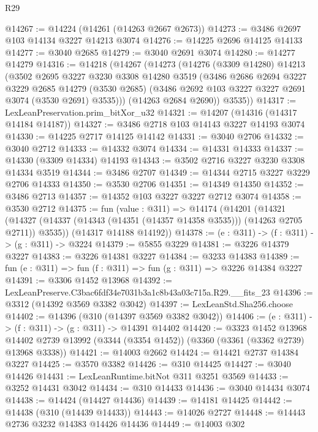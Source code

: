 \begin{lexlean}{R29}
\begin{coremodule}
@14267 := @14224 (@14261 (@14263 @2667 @2673))
@14273 := @3486 @2697 @103 @14134 @3227 @14213 @3074
@14276 := @14225 @2696 @14125 @14133
@14277 := @3040 @2685
@14279 := @3040 @2691 @3074
@14280 := @14277 @14279
@14316 := @14218
    (@14267
      (@14273
        (@14276
          (@3309 @14280)
          @14213
          (@3502
            @2695
            @3227
            @3230
            @3308
            @14280
            @3519
            (@3486
              @2686
              @2694
              @3227
              @3229
              @2685
              @14279
              (@3530 @2685)
              (@3486 @2692 @103 @3227 @3227 @2691 @3074 (@3530 @2691) @3535)))
          (@14263 @2684 @2690))
        @3535))
@14317 := LexLeanPreservation.prim_bitXor_u32
@14321 := @14207 (@14316 (@14317 @14184 @14187))
@14327 := @3486 @2718 @103 @14143 @3227 @14193 @3074
@14330 := @14225 @2717 @14125 @14142
@14331 := @3040 @2706
@14332 := @3040 @2712
@14333 := @14332 @3074
@14334 := @14331 @14333
@14337 := @14330 (@3309 @14334) @14193
@14343 := @3502 @2716 @3227 @3230 @3308 @14334 @3519
@14344 := @3486 @2707
@14349 := @14344 @2715 @3227 @3229 @2706 @14333
@14350 := @3530 @2706
@14351 := @14349 @14350
@14352 := @3486 @2713
@14357 := @14352 @103 @3227 @3227 @2712 @3074
@14358 := @3530 @2712
@14375 := fun (value : @311) =>
  @14174
    (@14201
      (@14321 (@14327 (@14337 (@14343 (@14351 (@14357 @14358 @3535))) (@14263 @2705 @2711)) @3535))
      (@14317 @14188 @14192))
@14378 := (e : @311) -> (f : @311) -> (g : @311) -> @3224
@14379 := @5855 @3229
@14381 := @3226 @14379 @3227
@14383 := @3226 @14381 @3227
@14384 := @3233 @14383
@14389 := fun (e : @311) => fun (f : @311) => fun (g : @311) => @3226 @14384 @3227
@14391 := @3306 @1452 @13968
@14392 := LexLeanPreserve.C3bac6fdf34e7031b3a1c8b43a03c715a.R29.__fits_23
@14396 := @3312 (@14392 @3569 @3382 @3042)
@14397 := LexLeanStd.Sha256.choose
@14402 := @14396 (@310 (@14397 @3569 @3382 @3042))
@14406 := (e : @311) -> (f : @311) -> (g : @311) -> @14391 @14402
@14420 := @3323
    @1452
    @13968
    @14402
    @2739
    @13992
    (@3344 (@3354 @1452))
    (@3360 (@3361 (@3362 @2739) @13968 @3338))
@14421 := @14003 @2662
@14424 := @14421 @2737 @14384 @3227
@14425 := @3570 @3382
@14426 := @310 @14425
@14427 := @3040 @14426
@14431 := LexLeanRuntime.bitNot @311 @3251 @3569
@14433 := @3252 @14431 @3042
@14434 := @310 @14433
@14436 := @3040 @14434 @3074
@14438 := @14424 (@14427 @14436)
@14439 := @14181 @14425
@14442 := @14438 (@310 (@14439 @14433))
@14443 := @14026 @2727
@14448 := @14443 @2736 @3232 @14383 @14426 @14436
@14449 := @14003 @302

\end{coremodule}
\end{lexlean}
